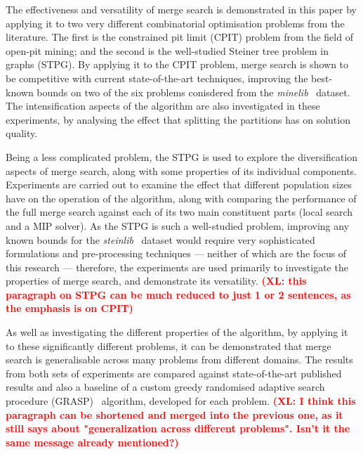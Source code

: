 \documentclass[preprint]{elsarticle}
\newcommand{\xl}[1]{\textbf{\textcolor{red}{(XL: #1)}}}
\begin{document}
The effectiveness and versatility of merge search is demonstrated in this paper by applying it to two very different combinatorial optimisation problems from the literature. The first is the constrained pit limit (CPIT) problem from the field of open-pit mining; and the second is the well-studied Steiner tree problem in graphs (STPG). By applying it to the CPIT problem, merge search is shown to be competitive with current state-of-the-art techniques, improving the best-known bounds on two of the six problems conisdered from the \emph{minelib}~\citep{minelib} dataset. The intensification aspects of the algorithm are also investigated in these experiments, by analysing the effect that splitting the partitions has on solution quality.

Being a less complicated problem, the STPG is used to explore the diversification aspects of merge search, along with some properties of its individual components. Experiments are carried out to examine the effect that different population sizes have on the operation of the algorithm, along with comparing the performance of the full merge search against each of its two main constituent parts (local search and a MIP solver). As the STPG is such a well-studied problem, improving any known bounds for the \emph{steinlib}~\citep{steinlib} dataset would require very sophisticated formulations and pre-processing techniques --- neither of which are the focus of this research --- therefore, the experiments are used primarily to investigate the properties of merge search, and demonstrate its versatility. \xl{this paragraph on STPG can be much reduced to just 1 or 2 sentences, as the emphasis is on CPIT}

As well as investigating the different properties of the algorithm, by applying it to these significantly different problems, it can be demonstrated that merge search is generalisable across many problems from different domains. The results from both sets of experiments are compared against state-of-the-art published results and also a baseline of a custom greedy randomised adaptive search procedure (GRASP)~\citep{grasp:feo} algorithm, developed for each problem. \xl{I think this paragraph can be shortened and merged into the previous one, as it still says about "generalization across different problems". Isn't it the same message already mentioned?}
\end{document}
